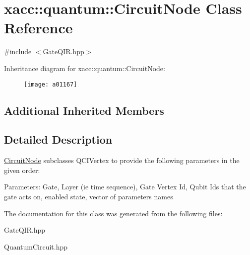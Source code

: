\hypertarget{a01167}{}\section{xacc\+:\+:quantum\+:\+:Circuit\+Node Class Reference}
\label{a01167}


{\ttfamily \#include $<$Gate\+Q\+I\+R.\+hpp$>$}

Inheritance diagram for xacc\+:\+:quantum\+:\+:Circuit\+Node\+:\begin{figure}[H]
\begin{center}
\leavevmode
\texttt{[image: a01167]}
\end{center}
\end{figure}
\subsection*{Additional Inherited Members}


\subsection{Detailed Description}
\hyperlink{a01167}{Circuit\+Node} subclasses Q\+C\+I\+Vertex to provide the following parameters in the given order\+:

Parameters\+: Gate, Layer (ie time sequence), Gate Vertex Id, Qubit Ids that the gate acts on, enabled state, vector of parameters names 

The documentation for this class was generated from the following files\+:\begin{DoxyCompactItemize}
\item 
Gate\+Q\+I\+R.\+hpp\item 
Quantum\+Circuit.\+hpp\end{DoxyCompactItemize}
